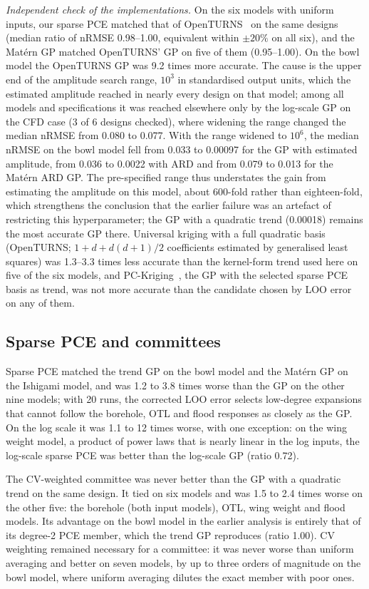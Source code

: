 \emph{Independent check of the implementations.} On the six models with
uniform inputs, our sparse PCE matched that of OpenTURNS~\cite{baudin2017}
on the same designs (median ratio of nRMSE 0.98--1.00, equivalent within
$\pm20\%$ on all six), and the Mat\'ern GP matched OpenTURNS' GP on five of
them (0.95--1.00). On the bowl model the OpenTURNS GP was 9.2 times more
accurate. The cause is the upper end of the amplitude search range, $10^3$
in standardised output units, which the estimated amplitude reached in
nearly every design on that model; among all models and specifications it
was reached elsewhere only by the log-scale GP on the CFD case (3 of 6
designs checked), where widening the range changed the median nRMSE from
0.080 to 0.077. With the range widened to $10^6$, the median nRMSE on the
bowl model fell from 0.033 to 0.00097 for the GP with estimated
amplitude, from 0.036 to 0.0022 with ARD and from 0.079 to 0.013 for the
Mat\'ern ARD GP. The pre-specified range thus understates the gain from
estimating the amplitude on this model, about 600-fold rather than
eighteen-fold, which strengthens the conclusion that the earlier failure
was an artefact of restricting this hyperparameter; the GP with a quadratic
trend (0.00018) remains the most accurate GP there. Universal kriging with
a full quadratic basis (OpenTURNS; $1+d+d(d+1)/2$ coefficients estimated by
generalised least squares) was 1.3--3.3 times less accurate than the
kernel-form trend used here on five of the six models, and
PC-Kriging~\cite{schobi2015}, the GP with the selected sparse PCE basis as
trend, was not more accurate than the candidate chosen by LOO error on any
of them.

\subsection{Sparse PCE and committees}
Sparse PCE matched the trend GP on the bowl model and the Mat\'ern GP on
the Ishigami model, and was 1.2 to 3.8 times worse than the GP on the other
nine models; with 20 runs, the corrected LOO error selects low-degree
expansions that cannot follow the borehole, OTL and flood responses as
closely as the GP. On the log scale it was 1.1 to 12 times worse, with one
exception: on the wing weight model, a product of power laws that is
nearly linear in the log inputs, the log-scale sparse PCE was better than
the log-scale GP (ratio 0.72).

The CV-weighted committee was never better than the GP with a quadratic
trend on the same design. It tied on six models and was 1.5 to 2.4 times
worse on the other five: the borehole (both input models), OTL, wing weight
and flood models. Its
advantage on the bowl model in the earlier analysis is entirely that of
its degree-2 PCE member, which the trend GP reproduces (ratio 1.00). CV
weighting remained necessary for a committee: it was never worse than
uniform averaging and better on seven models, by up to three orders of
magnitude on the bowl model, where uniform averaging dilutes the exact
member with poor ones.

